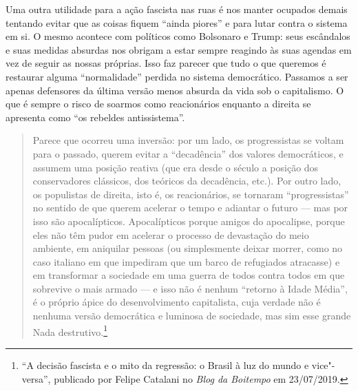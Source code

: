 Uma outra utilidade para a ação fascista nas ruas é nos manter ocupados demais tentando evitar que as coisas fiquem ``ainda piores'' e para lutar contra o sistema em si. O mesmo acontece com políticos como Bolsonaro e Trump: seus escândalos e suas medidas absurdas nos obrigam a estar sempre reagindo às suas agendas em vez de seguir as nossas próprias. Isso faz parecer que tudo o que queremos é restaurar alguma ``normalidade'' perdida no sistema democrático. Passamos a ser apenas defensores da última versão menos absurda da vida sob o capitalismo. O que é sempre o risco de soarmos como reacionários enquanto a direita se apresenta como ``os rebeldes antissistema''.

\begin{quote}
Parece que ocorreu uma inversão: por um lado, os progressistas se voltam para o passado, querem evitar a ``decadência'' dos valores democráticos, e assumem uma posição reativa (que era desde o século  a posição dos conservadores clássicos, dos teóricos da decadência, etc.). Por outro lado, os populistas de direita, isto é, os reacionários, se tornaram ``progressistas'' no sentido de que querem acelerar o tempo e adiantar o futuro --- mas por isso são apocalípticos. Apocalípticos porque amigos do apocalipse, porque eles não têm pudor em acelerar o processo de devastação do meio ambiente, em aniquilar pessoas (ou simplesmente deixar morrer, como no caso italiano em que impediram que um barco de refugiados atracasse) e em transformar a sociedade em uma guerra de todos contra todos em que sobrevive o mais armado --- e isso não é nenhum ``retorno à Idade Média'', é o próprio ápice do desenvolvimento capitalista, cuja verdade não é nenhuma versão democrática e luminosa de sociedade, mas sim esse grande Nada destrutivo.\footnote{``A decisão fascista e o mito da regressão: o Brasil à luz do mundo e vice"-versa'', publicado por Felipe Catalani no \emph{Blog da Boitempo} em 23/07/2019.}
\end{quote}


